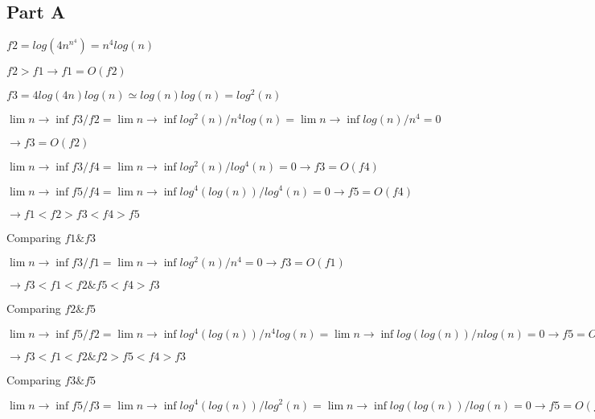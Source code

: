 \documentclass[12pt,twoside]{article}
\begin{document}

\begin{problems}

\section*{Part A}

\problem  %

\begin{problemparts}
\problempart %
$f2 = log(4n^{n^{4}})=n^{4}log(n)$

$f2>f1 \rightarrow f1 = O(f2)$

$f3 = 4log(4n)log(n) \simeq log(n)log(n) = log^{2}(n)$

$ \lim n \rightarrow \inf f3/f2 = \lim n \rightarrow \inf log^{2}(n) / n^{4}log(n) = \lim n \rightarrow \inf log(n) / n^{4} = 0 $

$\rightarrow f3 = O(f2) $

$ \lim n \rightarrow \inf f3/f4 = \lim n \rightarrow \inf log^{2}(n) / log^{4}(n) = 0 \rightarrow f3 = O(f4) $


$ \lim n \rightarrow \inf f5/f4 = \lim n \rightarrow \inf log^{4}(log(n)) / log^{4}(n) = 0 \rightarrow f5 = O(f4) $

$ \rightarrow f1 < f2 > f3 < f4 > f5 $

Comparing $f1 \& f3$

$ \lim n \rightarrow \inf f3/f1 = \lim n \rightarrow \inf log^{2}(n) / n^{4} = 0 \rightarrow f3 = O(f1) $

$ \rightarrow f3 < f1 < f2 \& f5 < f4 > f3 $

Comparing $f2 \& f5$

$ \lim n \rightarrow \inf f5/f2 = \lim n \rightarrow \inf log^{4}(log(n))/n^{4}log(n) = \lim n \rightarrow \inf log(log(n))/nlog(n)  = 0 \rightarrow f5 = O(f2) $

$ \rightarrow f3 < f1 < f2 \& f2 > f5 < f4 > f3 $

Comparing $f3 \& f5$

$ \lim n \rightarrow \inf f5/f3 = \lim n \rightarrow \inf log^{4}(log(n))/log^2(n) = \lim n \rightarrow \inf log(log(n))/log(n)  = 0 \rightarrow f5 = O(f3) $


\end{problemparts}
\end{problems}
\end{document}
